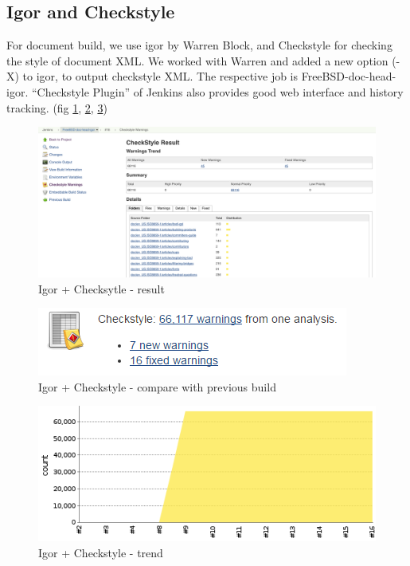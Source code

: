 \documentclass[a4paper,twocolumn,10pt]{article}
\begin{document}
\subsection{Igor and Checkstyle}

For document build, we use igor by Warren Block, and Checkstyle for checking
the style of document XML. We worked with Warren and added a new option (-X) to
igor, to output checkstyle XML. The respective job is FreeBSD-doc-head-igor.
``Checkstyle Plugin'' of Jenkins also provides good web interface and history
tracking. (fig \ref{checkstyle-result}, \ref{checkstyle-compare},
\ref{checkstyle-trend})

\begin{figure}
\includegraphics[width=\textwidth]{checkstyle-result.png}
\caption{Igor + Checksytle - result}
\label{checkstyle-result}
\end{figure}

\begin{figure}
\includegraphics{checkstyle-compare.png}
\caption{Igor + Checkstyle - compare with previous build}
\label{checkstyle-compare}
\end{figure}

\begin{figure}
\includegraphics{checkstyle-trend.png}
\caption{Igor + Checkstyle - trend}
\label{checkstyle-trend}
\end{figure}
\end{document}
